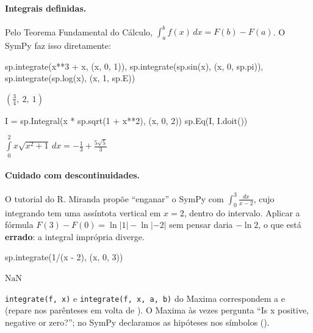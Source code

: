 \paragraph{Integrais definidas.} Pelo Teorema Fundamental do Cálculo, $\int_a^b f(x)\,dx=F(b)-F(a)$. O SymPy faz
isso diretamente:

\begin{entrada}
sp.integrate(x**3 + x, (x, 0, 1)), sp.integrate(sp.sin(x), (x, 0, sp.pi)), sp.integrate(sp.log(x), (x, 1, sp.E))
\end{entrada}
\begin{saidamat}
$\displaystyle \left( \frac{3}{4}, \  2, \  1\right)$
\end{saidamat}

\begin{entrada}
I = sp.Integral(x * sp.sqrt(1 + x**2), (x, 0, 2))
sp.Eq(I, I.doit())
\end{entrada}
\begin{saidamat}
$\displaystyle \int\limits_{0}^{2} x \sqrt{x^{2} + 1}\, dx = - \frac{1}{3} + \frac{5 \sqrt{5}}{3}$
\end{saidamat}

\paragraph{Cuidado com descontinuidades.} O tutorial do R. Miranda propõe ``enganar'' o SymPy com
$\int_0^3\frac{dx}{x-2}$, cujo integrando tem uma assíntota vertical em $x=2$, dentro do intervalo. Aplicar a
fórmula $F(3)-F(0)=\ln|1|-\ln|-2|$ sem pensar daria $-\ln 2$, o que está \textbf{errado}: a integral imprópria
diverge.

\begin{entrada}
sp.integrate(1/(x - 2), (x, 0, 3))
\end{entrada}
\begin{saidamat}
$\displaystyle \text{NaN}$
\end{saidamat}

\begin{maxima}
\texttt{integrate(f, x)} e \texttt{integrate(f, x, a, b)} do Maxima correspondem a  e
 (repare nos parênteses em volta de ). O Maxima às vezes pergunta
``Is x positive, negative or zero?''; no SymPy declaramos as hipóteses nos símbolos
().
\end{maxima}

